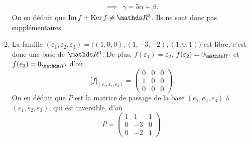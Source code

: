\begin{enumerate}
\begin{align*}
			\implies& \gamma = 5\alpha + \beta.
		\end{align*}
		On en déduit que $\Im f + \Ker f \neq \R^3$. Ils ne sont donc pas supplémentaires.
	\item La famille $(\varepsilon_1, \varepsilon_2, \varepsilon_3) = \big((1,0,0), (1, -3, -2), (1,0,1)\big)$\/ est libre, c'est donc une base de $\R^3$. De plus, $f(\varepsilon_1) = \varepsilon_2$, $f(\varepsilon_2) = 0_{\R^3}$\/ et $f(\varepsilon_3) = 0_{\R^3}$\/ d'où \[
			\Big[f\Big]_{(\varepsilon_1, \varepsilon_2, \varepsilon_3)} = \begin{pmatrix}
				0&0&0\\
				1&0&0\\
				0&0&0
			\end{pmatrix}
		.\] On en déduit que $P$\/ est la matrice de passage de la base $(e_1, e_2, e_3)$\/ à $(\varepsilon_1, \varepsilon_2, \varepsilon_3)$, qui est inversible, d'où \[
			P = \begin{pmatrix}
				1&1&1\\
				0&-3&0\\
				0&-2&1
			\end{pmatrix}
		.\]
\end{enumerate}
